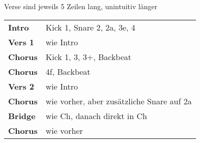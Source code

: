 
Verse sind jeweils 5 Zeilen lang, unintuitiv länger \\

\begin{tabular}{p{1.6cm}l}
	\textbf{Intro}  & Kick 1, Snare 2, 2a, 3e, 4                \\
	\textbf{Vers 1} & wie Intro                                 \\
	\textbf{Chorus} & Kick 1, 3, 3+, Backbeat                   \\ %
	\textbf{Chorus} & 4f, Backbeat                              \\ %
	\textbf{Vers 2} & wie Intro                                 \\
	\textbf{Chorus} & wie vorher, aber zusätzliche Snare auf 2a \\
	\textbf{Bridge} & wie Ch, danach direkt in Ch               \\
	\textbf{Chorus} & wie vorher                                \\
\end{tabular}
